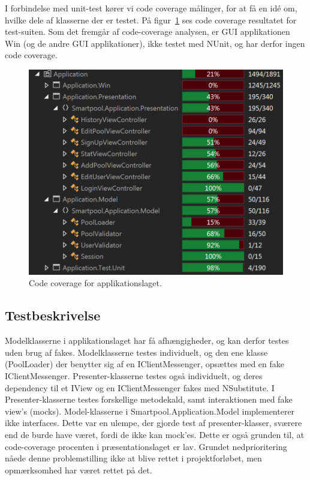 I forbindelse med unit-test kører vi code coverage målinger, for at få en idé om, hvilke dele af klasserne der er testet. På figur~\ref{fig:appcoverage} ses code coverage resultatet for test-suiten. Som det fremgår af code-coverage analysen, er GUI applikationen Win (og de andre GUI applikationer), ikke testet med NUnit, og har derfor ingen code coverage.

\begin{figure}
\centering
\includegraphics[width=0.9\linewidth]{figs/test/appcoverage}
\caption{Code coverage for applikationslaget.}
\label{fig:appcoverage}
\end{figure}

\subsection{Testbeskrivelse}
Modelklasserne i applikationslaget har få afhængigheder, og kan derfor testes uden brug af fakes. Modelklasserne testes individuelt, og den ene klasse (PoolLoader) der benytter sig af en IClientMessenger, opsættes med en fake IClientMessenger. Presenter-klasserne testes også individuelt, og deres dependency til et IView og en IClientMessenger fakes med NSubstitute. I Presenter-klasserne testes forskellige metodekald, samt interaktionen med fake view’s (mocks). Model-klasserne i Smartpool.Application.Model implementerer ikke interfaces. Dette var en ulempe, der gjorde test af presenter-klasser, sværere end de burde have været, fordi de ikke kan mock'es. Dette er også grunden til, at code-coverage procenten i præsentationslaget er lav. Grundet nedprioritering nåede denne problemstilling ikke at blive rettet i projektforløbet, men opmærksomhed har været rettet på det.

